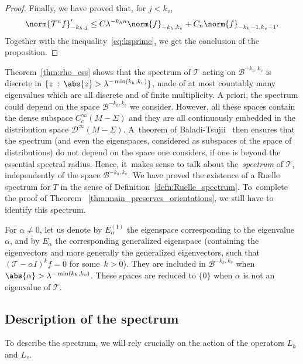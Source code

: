 \documentclass[10pt]{amsart}
\newcommand{\boB}{\mathcal{B}}
\newcommand{\boD}{\mathcal{D}}
\newcommand{\boT}{\mathcal{T}}
\newcommand{\st}{\::\:}
\theoremstyle{definition}
\numberwithin{equation}{section}
\begin{document}
\begin{proof}
Finally, we have proved that, for $j < k_v$,
\begin{equation*}
\norm{\boT^n f}'_{-k_h, j} \leq C \lambda^{-k_h n} \norm{f}_{-k_h, k_v} + C_n \norm{f}_{-k_h-1, k_v-1}.
\end{equation*}
Together with the inequality~\eqref{eq:ksprime}, we get the conclusion of the
proposition.
\end{proof}

Theorem~\ref{thm:rho_ess} shows that the spectrum of $\boT$ acting on
$\boB^{-k_h, k_v}$ is discrete in \hbox{$\{z \st \abs{z} > \lambda^{-\min(k_h,
k_v)}\}$}, made of at most countably many eigenvalues which are all discrete
and of finite multiplicity. A priori, the spectrum could depend on the space
$\boB^{-k_h, k_v}$ we consider. However, all these spaces contain the dense
subspace $C^\infty_c(M-\Sigma)$ and they are all continuously embedded in the
distribution space $\boD^\infty(M-\Sigma)$. A~theorem of
Baladi-Tsujii~\cite[Lem.\,A.1]{bt_zeta} then ensures that the spectrum (and
even the eigenspaces, considered as subspaces of the space of distributions)
do not depend on the space one considers, if one is beyond the essential
spectral radius. Hence, it~makes sense to talk about the~\emph{spectrum} of
$\boT$, independently of the space $\boB^{-k_h, k_v}$. We have proved the
existence of a Ruelle spectrum for $T$ in the sense of
Definition~\ref{defn:Ruelle_spectrum}. To~complete the proof of Theorem
~\ref{thm:main_preserves_orientations}, we still have to identify this
spectrum.

For $\alpha \neq 0$, let us denote by $E_\alpha^{(1)}$ the eigenspace
corresponding to the eigenvalue~$\alpha$, and by $E_\alpha$ the corresponding
generalized eigenspace (containing the eigenvectors and more generally the
generalized eigenvectors, \ie such that $(\boT -\alpha I)^k f = 0$ for some~\hbox{$k > 0$}). They are included in $\boB^{-k_h, k_v}$ when $\abs{\alpha}
> \lambda^{-\min(k_h, k_v)}$. These spaces are reduced to $\{0\}$ when
$\alpha$ is not an eigenvalue of $\boT$.

\subsection{Description of the spectrum}

To describe the spectrum, we will rely crucially on the action of the
operators $L_h$ and $L_v$.
\end{document}
